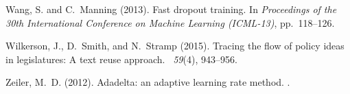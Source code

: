 \documentclass[10pt]{book}
\theoremstyle{definition}
\begin{document}
\begin{thebibliography}{11}
Wang, S. and C.~Manning (2013).
\newblock Fast dropout training.
\newblock In {\em Proceedings of the 30th International Conference on Machine
  Learning (ICML-13)}, pp.\  118--126.

Wilkerson, J., D.~Smith, and N.~Stramp (2015).
\newblock Tracing the flow of policy ideas in legislatures: A text reuse
  approach.
~{\em 59\/}(4),
  943--956.

Zeiler, M.~D. (2012).
\newblock Adadelta: an adaptive learning rate method.
.

\end{thebibliography}

%
%

%
\end{document}

